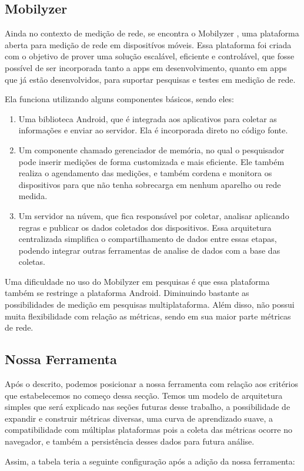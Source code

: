 \documentclass[12pt]{tcc}
\begin{document}
		\subsection{Mobilyzer}
		\par Ainda no contexto de medição de rede, se encontra o Mobilyzer \citep{Nikravesh2015Mobilyzer}, uma plataforma aberta para medição de rede em dispositívos móveis. Essa plataforma foi criada com o objetivo de prover uma solução escalável, eficiente e controlável, que fosse possível de ser incorporada tanto a apps em desenvolvimento, quanto em apps que já estão desenvolvidos, para suportar pesquisas e testes em medição de rede. 
		\par Ela funciona utilizando alguns componentes básicos, sendo eles: 
		\begin{enumerate}
			\item Uma biblioteca Android, que é integrada aos aplicativos para coletar as informações e enviar ao servidor. Ela é incorporada direto no código fonte.
			\item Um componente chamado gerenciador de memória, no qual o pesquisador pode inserir medições de forma customizada e mais eficiente. Ele também realiza o agendamento das medições, e também cordena e monitora os dispositivos para que não tenha sobrecarga em nenhum aparelho ou rede medida. 
			\item Um servidor na núvem, que fica responsável por coletar, analisar aplicando regras e publicar os dados coletados dos dispositivos. Essa arquitetura centralizada simplifica o compartilhamento de dados entre essas etapas, podendo integrar outras ferramentas de analise de dados com a base das coletas.

		\end{enumerate}
		\par Uma dificuldade no uso do Mobilyzer em pesquisas é que essa plataforma também se restringe a plataforma Android. Diminuindo bastante as possibilidades de medição em pesquisas multiplataforma. Além disso, não possui muita flexibilidade com relação as métricas, sendo em sua maior parte métricas de rede.

		\subsection{Nossa Ferramenta}
		\par Após o descrito, podemos posicionar a nossa ferramenta com relação aos critérios que estabelecemos no começo dessa secção. Temos um modelo de arquitetura simples que será explicado nas seções futuras desse trabalho, a possibilidade de expandir e construir métricas diversas, uma curva de aprendizado suave, a compatibilidade com múltiplas plataformas pois a coleta das métricas ocorre no navegador, e também a persistência desses dados para futura análise.
		\par Assim, a tabela teria a seguinte configuração após a adição da nossa ferramenta:
\end{document}
